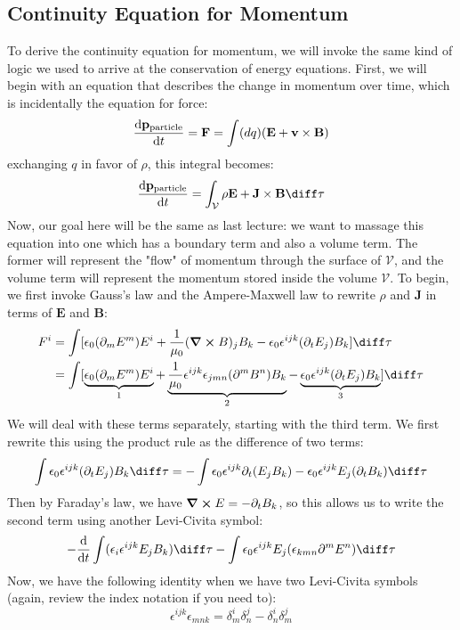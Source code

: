 \subsection{Continuity Equation for Momentum}
To derive the continuity equation for momentum, we will invoke the same kind of logic we used to arrive at
the conservation of energy equations. First, we will begin with an equation that describes the change in
momentum over time, which is incidentally the equation for force:
\[
	\dv{\mathbf{p}_\text{particle}}{t} = \mathbf{F} = \int (dq) (\mathbf{E} + \mathbf{v} \times \mathbf{B})
\]
exchanging \( q \) in favor of \( \rho \), this integral becomes:
\[
	\dv{\mathbf{p}_\text{particle}}{t} = \int_{\mathcal{V}} \rho \mathbf{E} + \mathbf{J} \times \mathbf{B}
	\diff \tau
\]
Now, our goal here will be the same as last lecture: we want to massage this equation into one which has a
boundary term and also a volume term. The former will represent the "flow" of momentum through the surface of
\( \mathcal{V} \), and the volume term will represent the momentum stored inside the volume \( \mathcal{V}
\). To begin, we first invoke Gauss's law and the Ampere-Maxwell law to rewrite \( \rho \) and \( \mathbf{J}
\) in terms of \( \mathbf{E} \) and \( \mathbf{B} \):
\begin{align*}
	F^{i} &= \int [\epsilon_0(\partial_m E^{m})E^{i} + \frac{1}{\mu_0}(\curl B)_j B_k - \epsilon_0
	\epsilon^{ijk}(\partial_t E_j) B_k] \diff \tau\\
		  &= \int [\underbrace{\epsilon_0 (\partial_m E^{m}) E^{i}}_1 + \underbrace{\frac{1}{\mu_0}\epsilon^{ijk}
	\epsilon_{jmn}(\partial^{m}B^{n})B_k}_2 - 
	\underbrace{\epsilon_0 \epsilon^{ijk} (\partial_t E_j)B_k}_3] \diff \tau 
\end{align*}
We will deal with these terms separately, starting with the third term. We first rewrite this using the
product rule as the difference of two terms:
\[
	\int \epsilon_0 \epsilon^{ijk}(\partial_t E_j) B_k \diff \tau = -\int \epsilon_0
	\epsilon^{ijk}\partial_t(E_j B_k) - \epsilon_0 \epsilon^{ijk}E_j (\partial_t B_k) \diff \tau
\]
Then by Faraday's law, we have \( \curl E = -\partial_t B_k \), so this allows us to write the second term
using another Levi-Civita symbol:
\[
	-\dv{t} \int (\epsilon_i \epsilon^{ijk} E_j B_k) \diff \tau - \int \epsilon_0 \epsilon^{ijk}
	E_j(\epsilon_{kmn}\partial^{m} E^{n}) \diff \tau 
\]
Now, we have the following identity when we have two Levi-Civita symbols (again, review the index notation if
you need to): 
\[
	\epsilon^{ijk}\epsilon_{mnk} = \delta^{i}_m \delta^{j}_n - \delta^{i}_n \delta^{j}_m
\]
